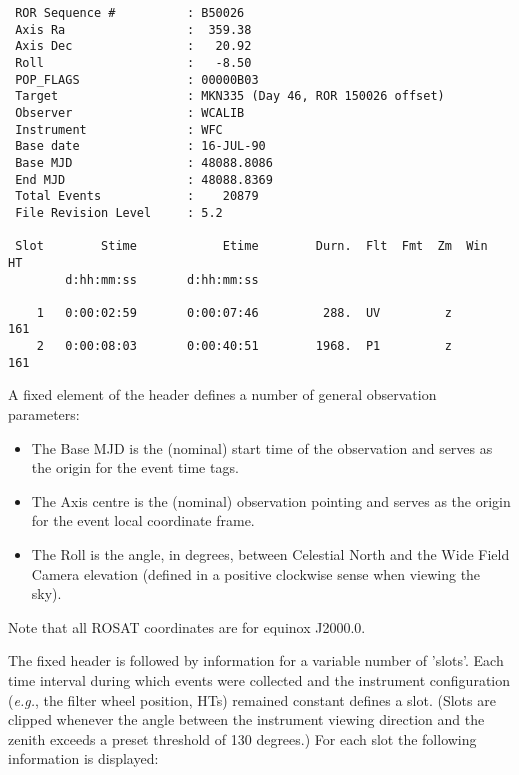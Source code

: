 \begin{verbatim}
 ROR Sequence #          : B50026    
 Axis Ra                 :  359.38
 Axis Dec                :   20.92
 Roll                    :   -8.50
 POP_FLAGS               : 00000B03
 Target                  : MKN335 (Day 46, ROR 150026 offset)      
 Observer                : WCALIB                                  
 Instrument              : WFC                                     
 Base date               : 16-JUL-90  
 Base MJD                : 48088.8086
 End MJD                 : 48088.8369
 Total Events            :    20879
 File Revision Level     : 5.2 

 Slot        Stime            Etime        Durn.  Flt  Fmt  Zm  Win   HT
        d:hh:mm:ss       d:hh:mm:ss

    1   0:00:02:59       0:00:07:46         288.  UV         z       161
    2   0:00:08:03       0:00:40:51        1968.  P1         z       161
\end{verbatim}

A fixed element of the header defines a number of general observation
parameters:

\begin{itemize}

\item The Base MJD is the (nominal) start time of the observation and
serves as the origin for the event time tags.

\item The Axis centre is the (nominal) observation pointing and serves
as the origin for the event local coordinate frame.

\item The Roll is the angle, in degrees, between Celestial North and
the Wide Field Camera elevation (defined in a positive clockwise sense
when viewing the sky).

\end{itemize}

Note that all ROSAT coordinates are for equinox J2000.0.

The fixed header is followed by information for a variable number of
'slots'. Each time interval during which events were collected and the
instrument configuration ({\em e.g.}, the filter wheel position, HTs)
remained constant defines a slot. (Slots are clipped whenever the angle
between the instrument viewing direction and the zenith exceeds a
preset threshold of 130 degrees.)  For each slot the following
information is displayed:

